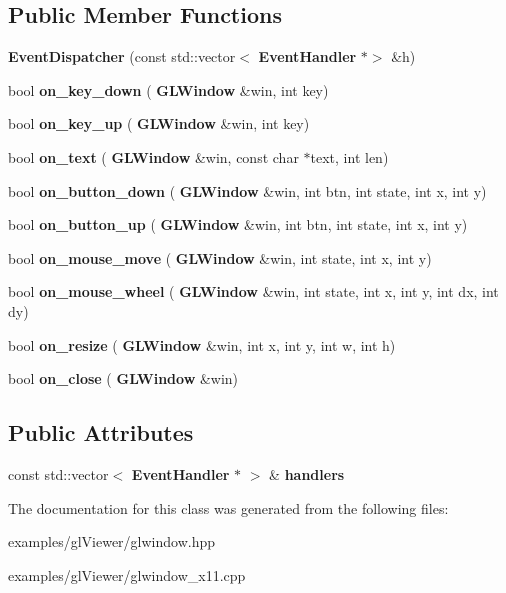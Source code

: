 \subsection*{Public Member Functions}
\begin{DoxyCompactItemize}
\item 
\mbox{\label{classglwindow_1_1_event_dispatcher_af6bc815caa60cb9c6781db5f0756e414}} 
{\bfseries Event\+Dispatcher} (const std\+::vector$<$ \textbf{ Event\+Handler} $\ast$$>$ \&h)
\item 
\mbox{\label{classglwindow_1_1_event_dispatcher_a101905128b1a416fbd9bf1adab9bcc44}} 
bool {\bfseries on\+\_\+key\+\_\+down} (\textbf{ G\+L\+Window} \&win, int key)
\item 
\mbox{\label{classglwindow_1_1_event_dispatcher_ac75bcbcdd9411c5f84b99764da2206a4}} 
bool {\bfseries on\+\_\+key\+\_\+up} (\textbf{ G\+L\+Window} \&win, int key)
\item 
\mbox{\label{classglwindow_1_1_event_dispatcher_aeae6ae67e9384d2cec6058fc603d065c}} 
bool {\bfseries on\+\_\+text} (\textbf{ G\+L\+Window} \&win, const char $\ast$text, int len)
\item 
\mbox{\label{classglwindow_1_1_event_dispatcher_ab3484ee0cfdc125d1d25550b3065aa90}} 
bool {\bfseries on\+\_\+button\+\_\+down} (\textbf{ G\+L\+Window} \&win, int btn, int state, int x, int y)
\item 
\mbox{\label{classglwindow_1_1_event_dispatcher_a0ab408899d7b617c82623596a4f46e67}} 
bool {\bfseries on\+\_\+button\+\_\+up} (\textbf{ G\+L\+Window} \&win, int btn, int state, int x, int y)
\item 
\mbox{\label{classglwindow_1_1_event_dispatcher_a5669333f26e662e6afdb9aede5d6fd54}} 
bool {\bfseries on\+\_\+mouse\+\_\+move} (\textbf{ G\+L\+Window} \&win, int state, int x, int y)
\item 
\mbox{\label{classglwindow_1_1_event_dispatcher_abdffd623813b637a85568664ac8918f2}} 
bool {\bfseries on\+\_\+mouse\+\_\+wheel} (\textbf{ G\+L\+Window} \&win, int state, int x, int y, int dx, int dy)
\item 
\mbox{\label{classglwindow_1_1_event_dispatcher_ac9c42e34d486adaf04fa9e6bba360439}} 
bool {\bfseries on\+\_\+resize} (\textbf{ G\+L\+Window} \&win, int x, int y, int w, int h)
\item 
\mbox{\label{classglwindow_1_1_event_dispatcher_af6e45a1615779b918fd94db1d0c4be32}} 
bool {\bfseries on\+\_\+close} (\textbf{ G\+L\+Window} \&win)
\end{DoxyCompactItemize}
\subsection*{Public Attributes}
\begin{DoxyCompactItemize}
\item 
\mbox{\label{classglwindow_1_1_event_dispatcher_ad110818c4668576c63d182e91070fbd7}} 
const std\+::vector$<$ \textbf{ Event\+Handler} $\ast$ $>$ \& {\bfseries handlers}
\end{DoxyCompactItemize}


The documentation for this class was generated from the following files\+:\begin{DoxyCompactItemize}
\item 
examples/gl\+Viewer/glwindow.\+hpp\item 
examples/gl\+Viewer/glwindow\+\_\+x11.\+cpp\end{DoxyCompactItemize}
